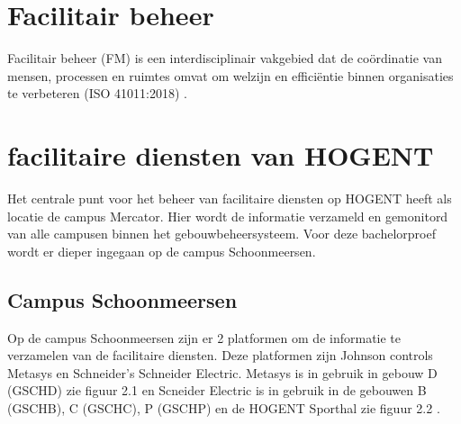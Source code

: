 %


\section{Facilitair beheer}
Facilitair beheer (FM) is een interdisciplinair vakgebied dat de coördinatie van mensen, processen en ruimtes omvat om welzijn en efficiëntie binnen organisaties te verbeteren (ISO 41011:2018) \autocite{jaouhari2023we}. 

\section{facilitaire diensten van HOGENT}
Het centrale punt voor het beheer van facilitaire diensten op HOGENT heeft als locatie de campus Mercator. Hier wordt de informatie verzameld en gemonitord van alle campusen binnen het gebouwbeheersysteem. Voor deze bachelorproef wordt er dieper ingegaan op de campus Schoonmeersen.

\subsection{Campus Schoonmeersen}
Op de campus Schoonmeersen zijn er 2 platformen om de informatie te verzamelen van de facilitaire diensten. Deze platformen zijn Johnson controls Metasys en Schneider's Schneider Electric. Metasys is in gebruik in gebouw D (GSCHD) zie figuur 2.1 en Scneider Electric is in gebruik in de gebouwen B (GSCHB), C (GSCHC), P (GSCHP) en de HOGENT Sporthal zie figuur 2.2 \autocite{Venneman2019}.

